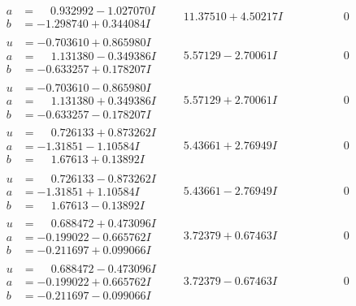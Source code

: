 \documentclass[1p]{elsarticle_modified}
\theoremstyle{definition}
\begin{document}
$$\begin{array}{c|c|c}
\begin{aligned}
a &= \phantom{-}0.932992 - 1.027070 I \\
b &= -1.298740 + 0.344084 I\end{aligned}
 & \phantom{-}11.37510 + 4.50217 I & \phantom{-0.000000 } 0 \\ \hline\begin{aligned}
u &= -0.703610 + 0.865980 I \\
a &= \phantom{-}1.131380 - 0.349386 I \\
b &= -0.633257 + 0.178207 I\end{aligned}
 & \phantom{-}5.57129 - 2.70061 I & \phantom{-0.000000 } 0 \\ \hline\begin{aligned}
u &= -0.703610 - 0.865980 I \\
a &= \phantom{-}1.131380 + 0.349386 I \\
b &= -0.633257 - 0.178207 I\end{aligned}
 & \phantom{-}5.57129 + 2.70061 I & \phantom{-0.000000 } 0 \\ \hline\begin{aligned}
u &= \phantom{-}0.726133 + 0.873262 I \\
a &= -1.31851 - 1.10584 I \\
b &= \phantom{-}1.67613 + 0.13892 I\end{aligned}
 & \phantom{-}5.43661 + 2.76949 I & \phantom{-0.000000 } 0 \\ \hline\begin{aligned}
u &= \phantom{-}0.726133 - 0.873262 I \\
a &= -1.31851 + 1.10584 I \\
b &= \phantom{-}1.67613 - 0.13892 I\end{aligned}
 & \phantom{-}5.43661 - 2.76949 I & \phantom{-0.000000 } 0 \\ \hline\begin{aligned}
u &= \phantom{-}0.688472 + 0.473096 I \\
a &= -0.199022 - 0.665762 I \\
b &= -0.211697 + 0.099066 I\end{aligned}
 & \phantom{-}3.72379 + 0.67463 I & \phantom{-0.000000 } 0 \\ \hline\begin{aligned}
u &= \phantom{-}0.688472 - 0.473096 I \\
a &= -0.199022 + 0.665762 I \\
b &= -0.211697 - 0.099066 I\end{aligned}
 & \phantom{-}3.72379 - 0.67463 I & \phantom{-0.000000 } 0\\

\end{array}$$
\end{document}
